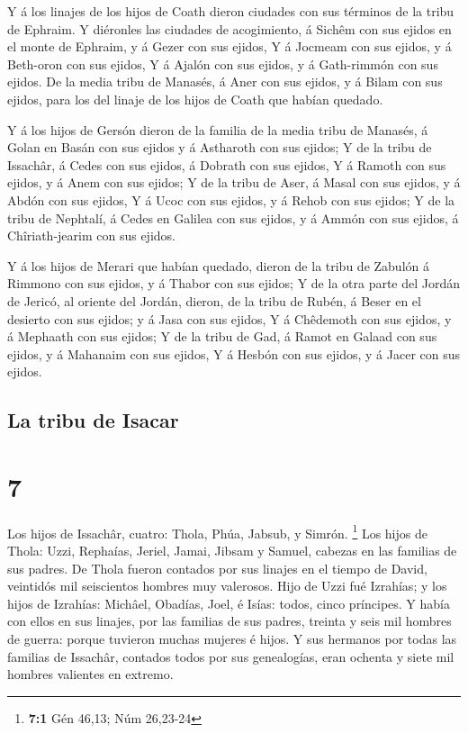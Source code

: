  Y á los linajes de los hijos de Coath dieron ciudades
con sus términos de la tribu de Ephraim.  Y diéronles las
ciudades de acogimiento, á Sichêm con sus ejidos en el monte de Ephraim,
y á Gezer con sus ejidos,  Y á Jocmeam con sus ejidos, y
á Beth-oron con sus ejidos,  Y á Ajalón con sus ejidos, y
á Gath-rimmón con sus ejidos.  De la media tribu de
Manasés, á Aner con sus ejidos, y á Bilam con sus ejidos, para los del
linaje de los hijos de Coath que habían quedado.

 Y á los hijos de Gersón dieron de la familia de la media
tribu de Manasés, á Golan en Basán con sus ejidos y á Astharoth con sus
ejidos;  Y de la tribu de Issachâr, á Cedes con sus
ejidos, á Dobrath con sus ejidos,  Y á Ramoth con sus
ejidos, y á Anem con sus ejidos;  Y de la tribu de Aser,
á Masal con sus ejidos, y á Abdón con sus ejidos,  Y á
Ucoc con sus ejidos, y á Rehob con sus ejidos;  Y de la
tribu de Nephtalí, á Cedes en Galilea con sus ejidos, y á Ammón con sus
ejidos, á Chîriath-jearim con sus ejidos.

 Y á los hijos de Merari que habían quedado, dieron de la
tribu de Zabulón á Rimmono con sus ejidos, y á Thabor con sus ejidos;
 Y de la otra parte del Jordán de Jericó, al oriente del
Jordán, dieron, de la tribu de Rubén, á Beser en el desierto con sus
ejidos; y á Jasa con sus ejidos,  Y á Chêdemoth con sus
ejidos, y á Mephaath con sus ejidos;  Y de la tribu de
Gad, á Ramot en Galaad con sus ejidos, y á Mahanaim con sus ejidos,
 Y á Hesbón con sus ejidos, y á Jacer con sus ejidos.

\hypertarget{la-tribu-de-isacar}{%
\subsection{La tribu de Isacar}\label{la-tribu-de-isacar}}

\hypertarget{section-6}{%
\section{7}\label{section-6}}

 Los hijos de Issachâr, cuatro: Thola, Phúa, Jabsub, y
Simrón. \footnote{\textbf{7:1} Gén 46,13; Núm 26,23-24} 
Los hijos de Thola: Uzzi, Rephaías, Jeriel, Jamai, Jibsam y Samuel,
cabezas en las familias de sus padres. De Thola fueron contados por sus
linajes en el tiempo de David, veintidós mil seiscientos hombres muy
valerosos.  Hijo de Uzzi fué Izrahías; y los hijos de
Izrahías: Michâel, Obadías, Joel, é Isías: todos, cinco príncipes.
 Y había con ellos en sus linajes, por las familias de sus
padres, treinta y seis mil hombres de guerra: porque tuvieron muchas
mujeres é hijos.  Y sus hermanos por todas las familias de
Issachâr, contados todos por sus genealogías, eran ochenta y siete mil
hombres valientes en extremo.

